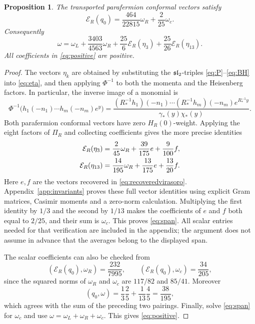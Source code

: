 \documentclass[11pt,reqno]{amsart}
\newtheorem{proposition}[theorem]{Proposition}
\theoremstyle{definition}\newtheorem{definition}[theorem]{Definition}
\theoremstyle{remark}\newtheorem{remark}[theorem]{Remark}
\numberwithin{equation}{section}
\begin{document}
\begin{proposition}\label{prop:positiveidentity}
The transported parafermion conformal vectors satisfy
\begin{equation}\label{eq:span}
 \mathcal E_R(q_0)=\frac{464}{22815}\omega_R+\frac2{25}\omega_c.
\end{equation}
Consequently
\begin{equation}\label{eq:positive}
 \omega=\omega_L+\frac{3403}{4563}\omega_R
       +\frac{25}{6}\mathcal E_R(\eta_3)
       +\frac{25}{26}\mathcal E_R(\eta_{13}).
\end{equation}
All coefficients in \eqref{eq:positive} are positive.
\end{proposition}
\begin{proof}
The vectors $\eta_k$ are obtained by substituting the $\mathfrak{sl}_2$-triples \eqref{eq:P}--\eqref{eq:BH} into \eqref{eq:eta}, and then applying $\Phi^{-1}$ to both the momenta and the Heisenberg factors. In particular, the inverse image of a monomial is
\begin{equation}\label{eq:inverseliftfull}
 \Phi^{-1}\bigl(h_1(-n_1)\cdots h_m(-n_m)e^y\bigr)
 =\frac{(R_*^{-1}h_1)(-n_1)\cdots(R_*^{-1}h_m)(-n_m)e^{R_*^{-1}y}}
 {\gamma_*(y)\chi_*(y)}.
\end{equation}
Both parafermion conformal vectors have zero $H_R(0)$-weight. Applying the eight factors of $\Pi_R$ and collecting coefficients gives the more precise identities
\begin{align}\label{eq:separateaverages}
 \mathcal E_R(\eta_3)&=\frac2{45}\omega_R+\frac{39}{175}e+\frac9{100}f,\notag\\
 \mathcal E_R(\eta_{13})&=\frac{14}{195}\omega_R+\frac{13}{175}e+\frac{13}{20}f.
\end{align}
Here $e,f$ are the vectors recovered in \eqref{eq:recoveredvirasoro}. Appendix~\ref{app:invariants} proves these full vector identities using explicit Gram matrices, Casimir moments and a zero-norm calculation. Multiplying the first identity by $1/3$ and the second by $1/13$ makes the coefficients of $e$ and $f$ both equal to $2/25$, and their sum is $\omega_c$. This proves \eqref{eq:span}. All scalar entries needed for that verification are included in the appendix; the argument does not assume in advance that the averages belong to the displayed span.

The scalar coefficients can also be checked from
\[
 (\mathcal E_R(q_0),\omega_R)=\frac{232}{7995},\qquad
 (\mathcal E_R(q_0),\omega_c)=\frac{34}{205},
\]
since the squared norms of $\omega_R$ and $\omega_c$ are $117/82$ and $85/41$. Moreover
\[
 (q_0,\omega)
 =\frac13\frac25+\frac1{13}\frac45=\frac{38}{195},
\]
which agrees with the sum of the preceding two pairings. Finally, solve \eqref{eq:span} for $\omega_c$ and use $\omega=\omega_L+\omega_R+\omega_c$. This gives \eqref{eq:positive}.
\end{proof}
\end{document}
